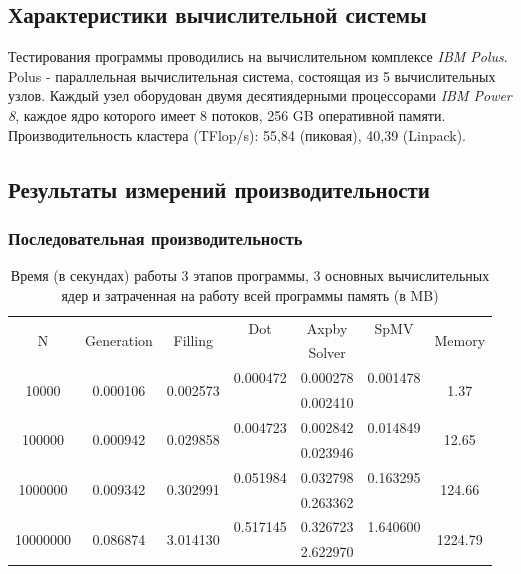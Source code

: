 	\subsection{Характеристики вычислительной системы}
	Тестирования программы проводились на вычислительном комплексе \textit{IBM Polus}. Polus - параллельная вычислительная система, состоящая из 5 вычислительных узлов. Каждый узел оборудован двумя десятиядерными процессорами \textit{IBM Power 8}, каждое ядро которого имеет 8 потоков, 256 GB оперативной памяти. Производительность кластера (TFlop/s): 55,84 (пиковая), 40,39 (Linpack).
	\subsection{Результаты измерений производительности}
		\subsubsection{Последовательная производительность}
		\begin{table}[H]
			\begin{tabular}{|c||c|c|c|c|c|c|}
				\hline
				\multirow{2}{*}{N} &  \multirow{2}{*}{Generation} & \multirow{2}{*}{Filling} & Dot & Axpby & SpMV          & \multirow{2}{*}{Memory} \\ \cline{4-6}
				                   &                              &                         & \multicolumn{3}{c|}{Solver}  &                         \\ \hline
                \multirow{2}{*}{10000} & \multirow{2}{*}{0.000106} & \multirow{2}{*}{0.002573} & 0.000472 & 0.000278 & 0.001478              & \multirow{2}{*}{1.37} \\ \cline{4-6}
                                       &                     &                    & \multicolumn{3}{c|}{0.002410} &               \\ \hline
                \multirow{2}{*}{100000} &  \multirow{2}{*}{0.000942} & \multirow{2}{*}{0.029858} & 0.004723 & 0.002842 & 0.014849 & \multirow{2}{*}{12.65} \\ \cline{4-6}
                                      &                     &                     & \multicolumn{3}{c|}{0.023946} &  \\ \hline
                \multirow{2}{*}{1000000} &  \multirow{2}{*}{0.009342} & \multirow{2}{*}{0.302991} & 0.051984 & 0.032798 & 0.163295 & \multirow{2}{*}{124.66} \\ \cline{4-6}
                                       &                     &                    & \multicolumn{3}{c|}{0.263362} &  \\ \hline
                \multirow{2}{*}{10000000} &  \multirow{2}{*}{0.086874} & \multirow{2}{*}{3.014130} & 0.517145 & 0.326723 & 1.640600 & \multirow{2}{*}{1224.79} \\ \cline{4-6}
                                       &                     &                    & \multicolumn{3}{c|}{2.622970} &  \\ \hline
			\end{tabular}
			\caption{Время (в секундах) работы 3 этапов программы, 3 основных вычислительных ядер и затраченная на работу всей программы память (в MB)}
			\label{seq}
		\end{table}
